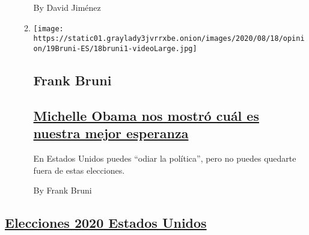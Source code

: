 \begin{enumerate}
\begin{enumerate}
    By David Jiménez
  \item
    \texttt{[image: https://static01.graylady3jvrrxbe.onion/images/2020/08/18/opinion/19Bruni-ES/18bruni1-videoLarge.jpg]}

    \hypertarget{frank-bruni}{%
    \subsection{Frank Bruni}\label{frank-bruni}}

    \hypertarget{michelle-obama-nos-mostruxf3-cuuxe1l-es-nuestra-mejor-esperanza}{%
    \subsection{\texorpdfstring{\href{/es/2020/08/19/espanol/opinion/michelle-obama-discurso.html}{Michelle
    Obama nos mostró cuál es nuestra mejor
    esperanza}}{Michelle Obama nos mostró cuál es nuestra mejor esperanza}}\label{michelle-obama-nos-mostruxf3-cuuxe1l-es-nuestra-mejor-esperanza}}

    En Estados Unidos puedes ``odiar la política'', pero no puedes
    quedarte fuera de estas elecciones.

    By Frank Bruni
  \end{enumerate}
\end{enumerate}

\hypertarget{elecciones-2020-estados-unidos}{%
\subsection{\texorpdfstring{\protect\hyperlink{}{Elecciones 2020 Estados
Unidos}}{Elecciones 2020 Estados Unidos}}\label{elecciones-2020-estados-unidos}}

